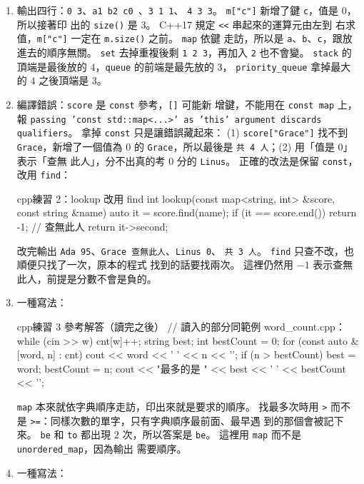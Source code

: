 \begin{enumerate}
\item 輸出四行：\texttt{0 3}、\texttt{a1 b2 c0 }、\texttt{3 1 1}、
\texttt{4 3 3}。 \texttt{m["c"]} 新增了鍵 \texttt{c}，值是 $0$，所以接著印
出的 \texttt{size()} 是 $3$。 C++17 規定 \texttt{<<} 串起來的運算元由左到
右求值，\texttt{m["c"]} 一定在 \texttt{m.size()} 之前。 \texttt{map} 依鍵
走訪，所以是 \texttt{a}、\texttt{b}、\texttt{c}，跟放進去的順序無關。
\texttt{set} 去掉重複後剩 \texttt{1 2 3}，再加入 \texttt{2} 也不會變。
\texttt{stack} 的頂端是最後放的 $4$，\texttt{queue} 的前端是最先放的 $3$，
\texttt{priority\_queue} 拿掉最大的 $4$ 之後頂端是 $3$。
\item 編譯錯誤：\texttt{score} 是 \texttt{const} 參考，\texttt{[]} 可能新
增鍵，不能用在 \texttt{const map} 上，報 \texttt{passing 'const
std::map<...>' as 'this' argument discards qualifiers}。 拿掉
\texttt{const} 只是讓錯誤藏起來：
(1) \texttt{score["Grace"]} 找不到 \texttt{Grace}，新增了一個值為 $0$ 的
\texttt{Grace}，所以最後是 \texttt{共 4 人}；(2) 用「值是 $0$」表示「查無
此人」，分不出真的考 $0$ 分的 \texttt{Linus}。 正確的改法是保留
\texttt{const}，改用 \texttt{find}：
\begin{code}{cpp}{練習 2：lookup 改用 find}
int lookup(const map<string, int> &score, const string &name) {
    auto it = score.find(name);
    if (it == score.end()) {
        return -1;                       // 查無此人
    }
    return it->second;
}
\end{code}
改完輸出 \texttt{Ada 95}、\texttt{Grace 查無此人}、\texttt{Linus 0}、
\texttt{共 3 人}。 \texttt{find} 只查不改，也順便只找了一次，原本的程式
找到的話要找兩次。 這裡仍然用 $-1$ 表示查無此人，前提是分數不會是負的。
\item 一種寫法：
\begin{code}{cpp}{練習 3 參考解答（讀完之後）}
// 讀入的部分同範例 word_count.cpp：while (cin >> w) cnt[w]++;
string best;
int bestCount = 0;
for (const auto &[word, n] : cnt) {
    cout << word << ' ' << n << '\n';
    if (n > bestCount) {
        best = word;
        bestCount = n;
    }
}
cout << "最多的是 " << best << ' ' << bestCount << '\n';
\end{code}
\texttt{map} 本來就依字典順序走訪，印出來就是要求的順序。 找最多次時用
\texttt{>} 而不是 \texttt{>=}：同樣次數的單字，只有字典順序最前面、最早遇
到的那個會被記下來。 \texttt{be} 和 \texttt{to} 都出現 $2$ 次，所以答案是
\texttt{be}。 這裡用 \texttt{map} 而不是 \texttt{unordered\_map}，因為輸出
需要順序。
\item 一種寫法：

\end{enumerate}
